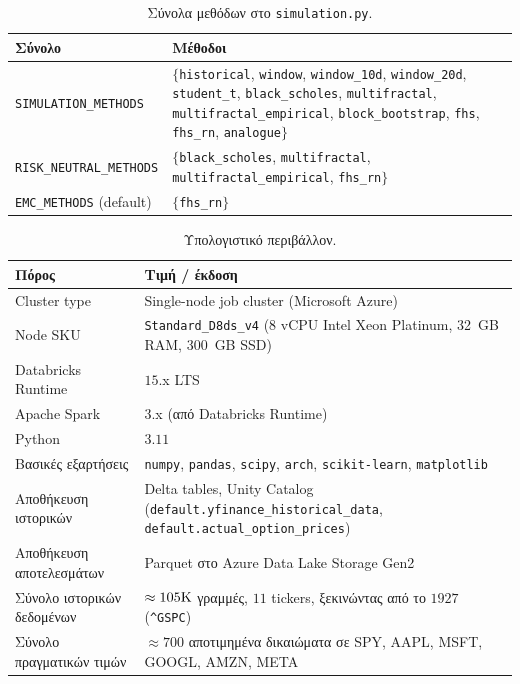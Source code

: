 \documentclass[12pt]{article}
\begin{document}
\begin{table}[H]
\centering
\small
\caption{Σύνολα μεθόδων στο \texttt{simulation.py}.}
\label{tab:appA_sets}
\begin{tabular}{p{4.8cm} p{7.7cm}}
\hline
Σύνολο & Μέθοδοι \\ \hline
\texttt{SIMULATION\_\allowbreak METHODS} & $\{$\texttt{historical}, \texttt{window}, \texttt{window\_10d}, \texttt{window\_20d}, \texttt{student\_t}, \texttt{black\_scholes}, \texttt{multifractal}, \texttt{multifractal\_\allowbreak empirical}, \texttt{block\_\allowbreak bootstrap}, \texttt{fhs}, \texttt{fhs\_rn}, \texttt{analogue}$\}$ \\
\texttt{RISK\_\allowbreak NEUTRAL\_\allowbreak METHODS} & $\{$\texttt{black\_scholes}, \texttt{multifractal}, \texttt{multifractal\_\allowbreak empirical}, \texttt{fhs\_rn}$\}$ \\
\texttt{EMC\_METHODS} (default) & $\{$\texttt{fhs\_rn}$\}$ \\ \hline
\end{tabular}
\end{table}

\begin{table}[H]
\centering
\small
\caption{Υπολογιστικό περιβάλλον.}
\label{tab:appA_env}
\begin{tabular}{p{4.5cm} p{8.0cm}}
\hline
Πόρος & Τιμή / έκδοση \\ \hline
Cluster type & Single-node job cluster (Microsoft Azure) \\
Node SKU & \texttt{Standard\_D8ds\_v4} (8 vCPU Intel Xeon Platinum, 32~GB RAM, 300~GB SSD) \\
Databricks Runtime & $15$.x LTS \\
Apache Spark & $3$.x (από Databricks Runtime) \\
Python & $3.11$ \\
Βασικές εξαρτήσεις & \texttt{numpy}, \texttt{pandas}, \texttt{scipy}, \texttt{arch}, \texttt{scikit-learn}, \texttt{matplotlib} \\
Αποθήκευση ιστορικών & Delta tables, Unity Catalog (\texttt{default.yfinance\_historical\_data}, \texttt{default.actual\_option\_prices}) \\
Αποθήκευση αποτελεσμάτων & Parquet στο Azure Data Lake Storage Gen2 \\
Σύνολο ιστορικών δεδομένων & $\approx 105{\rm K}$ γραμμές, $11$ tickers, ξεκινώντας από το $1927$ (\texttt{\textasciicircum GSPC}) \\
Σύνολο πραγματικών τιμών & $\approx 700$ αποτιμημένα δικαιώματα σε SPY, AAPL, MSFT, GOOGL, AMZN, META \\ \hline
\end{tabular}
\end{table}
\end{document}

